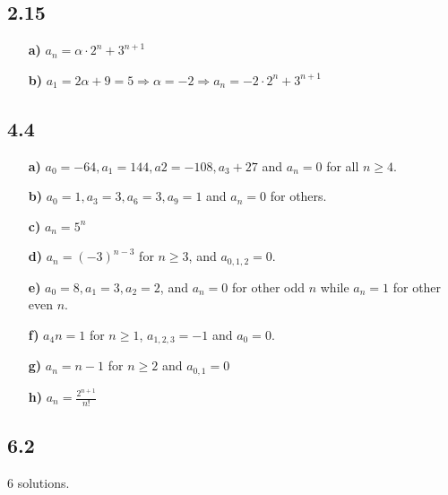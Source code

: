 \documentclass[10pt]{ctexart}
\begin{document}
    \subsection*{2.15}
        \begin{itemize}
            \item [\textbf{a)}] $a_n = \alpha \cdot 2^n + 3^{n+1}$
            \item [\textbf{b)}] $a_1 = 2\alpha + 9 = 5 \Rightarrow \alpha = -2 \Rightarrow a_n = -2 \cdot 2^n + 3^{n+1}$
        \end{itemize}

    \subsection*{4.4}
        \begin{itemize}
            \item [\textbf{a)}] $a_0 = -64, a_1 = 144, a2 = -108, a_3 + 27$ and $a_n = 0$ for all $n \geq 4$.
            \item [\textbf{b)}] $a_0 = 1, a_3 = 3, a_6 = 3, a_9 = 1$ and $a_n = 0$ for others.
            \item [\textbf{c)}] $a_n = 5^n$
            \item [\textbf{d)}] $a_n = (-3)^{n-3}$ for $n \geq 3$, and $a_{0,1,2} = 0$.
            \item [\textbf{e)}] $a_0 = 8, a_1 = 3, a_2 = 2$, and $a_n = 0$ for other odd $n$ while $a_n = 1$ for other even $n$.
            \item [\textbf{f)}] $a_4n = 1$ for $n \geq 1$, $a_{1, 2, 3} = -1$ and $a_0 = 0$.
            \item [\textbf{g)}] $a_n = n - 1$ for $n \geq 2$ and $a_{0, 1}= 0$
            \item [\textbf{h)}] $a_n = \frac{2^{n+1}}{n!}$
        \end{itemize}

    \subsection*{6.2}
    6 solutions.
\end{document}
